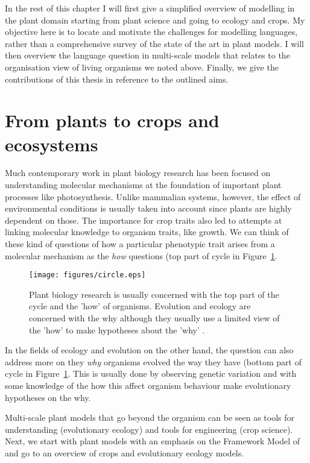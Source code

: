 In the rest of this chapter I will first give a simplified overview of modelling
in the plant domain starting from plant science and going to ecology and
crops. My objective here is to locate and motivate the challenges for modelling
languages, rather than a comprehensive survey of the state of the art in plant
models. I will then overview the language question in multi-scale models that
relates to the organisation view of living organisms we noted above. Finally, we
give the contributions of this thesis in reference to the outlined aims.

\section{From plants to crops and ecosystems}
Much contemporary work in plant biology research has been focused on
understanding molecular mechanisms at the foundation of important plant
processes like photosynthesis. Unlike mammalian systems, however, the effect of
environmental conditions is usually taken into account since plants are highly
dependent on those. The importance for crop traits also led to attempts at
linking molecular knowledge to organism traits, like growth. We can think of
these kind of questions of how a particular phenotypic trait arises from a
molecular mechanism as the \emph{how} questions (top part of cycle in
Figure~\ref{fig:circle}.

\begin{figure}[tb]
  \centering
  \texttt{[image: figures/circle.eps]}
  \caption{Plant biology research is usually concerned with the top part of the
    cycle and the 'how' of organisms. Evolution and ecology are concerned with
    the why although they usually use a limited view of the 'how' to make
    hypotheses about the 'why' \citep[adapted
    from][]{millar_intracellular_2016}.}
  \label{fig:circle}
\end{figure}

In the fields of ecology and evolution on the other hand, the question can also
address more on they \emph{why} organisms evolved the way they have (bottom part
of cycle in Figure~\ref{fig:circle}. This is usually done by observing genetic
variation and with some knowledge of the how this affect organism behaviour make
evolutionary hypotheses on the why.

Multi-scale plant models that go beyond the organism can be seen as tools for
understanding (evolutionary ecology) and tools for engineering (crop
science). Next, we start with plant models with an emphasis on the Framework
Model of \citet{chew_multiscale_2014} and go to an overview of crops and
evolutionary ecology models.

